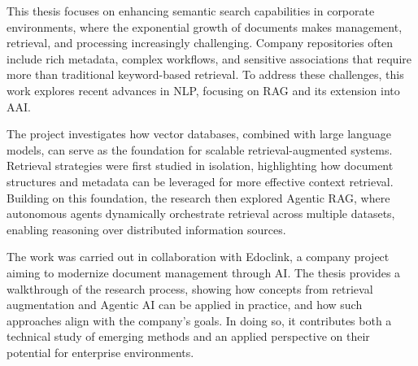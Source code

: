 \acresetall
\noindent  
This thesis focuses on enhancing semantic search capabilities in corporate environments, where the exponential growth of documents makes management, retrieval, and processing increasingly challenging. Company repositories often include rich metadata, complex workflows, and sensitive associations that require more than traditional keyword-based retrieval. To address these challenges, this work explores recent advances in \ac{NLP}, focusing on \ac{RAG} and its extension into \ac{AAI}.


The project investigates how vector databases, combined with large language models, can serve as the foundation for scalable retrieval-augmented systems. Retrieval strategies were first studied in isolation, highlighting how document structures and metadata can be leveraged for more effective context retrieval. Building on this foundation, the research then explored Agentic RAG, where autonomous agents dynamically orchestrate retrieval across multiple datasets, enabling reasoning over distributed information sources.


The work was carried out in collaboration with Edoclink, a company project aiming to modernize document management through AI. The thesis provides a walkthrough of the research process, showing how concepts from retrieval augmentation and Agentic AI can be applied in practice, and how such approaches align with the company’s goals. In doing so, it contributes both a technical study of emerging methods and an applied perspective on their potential for enterprise environments.